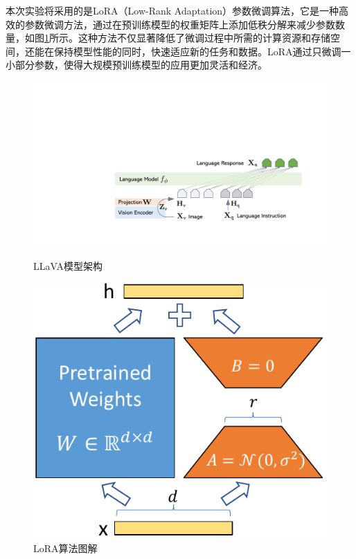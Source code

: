 \documentclass[
    linespread = 1.25
]{ctexart}
\begin{document}
本次实验将采用的是LoRA（Low-Rank Adaptation）参数微调算法\cite{hu2021loralowrankadaptationlarge}，它是一种高效的参数微调方法，通过在预训练模型的权重矩阵上添加低秩分解来减少参数数量，如图\ref{fig:LoRA}所示。这种方法不仅显著降低了微调过程中所需的计算资源和存储空间，还能在保持模型性能的同时，快速适应新的任务和数据。LoRA通过只微调一小部分参数，使得大规模预训练模型的应用更加灵活和经济。

\begin{figure}[htbp]
  \centering
  \begin{minipage}[b]{0.6\textwidth}
    \includegraphics[width=\textwidth]{illu_llava.pdf}
    \caption{LLaVA模型架构}
    \label{fig:LLaVA}
  \end{minipage}
  \hfill
  \begin{minipage}[b]{0.25\textwidth}
    \includegraphics[width=\textwidth]{illu_lora.pdf}
    \caption{LoRA算法图解}
    \label{fig:LoRA}
  \end{minipage}
\end{figure}
\end{document}

